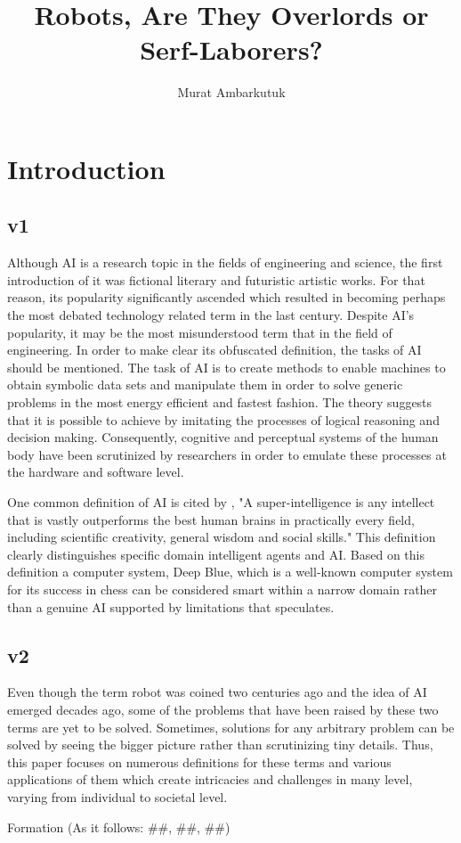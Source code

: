 \documentclass[man]{apa6}
\title{Robots, Are They Overlords or Serf-Laborers?}
\author{Murat Ambarkutuk}
\affiliation{English Language Institute, University of Delaware \\ murata@udel.edu}
\begin{document}
\maketitle
\section{Introduction}
\subsection{v1}
Although AI is a research topic in the fields of engineering and science, the first introduction of it was fictional literary and futuristic artistic works. For that reason, its popularity significantly ascended which resulted in becoming perhaps the most debated technology related term in the last century. Despite AI's popularity, it may be the most misunderstood term that in the field of engineering. In order to make clear its obfuscated definition, the tasks of AI should be mentioned. The task of AI is to create methods to enable machines to obtain symbolic data sets and manipulate them in order to solve generic problems in the most energy efficient and fastest fashion. The theory suggests that it is possible to achieve by imitating the processes of logical reasoning and decision making. Consequently, cognitive and perceptual systems of the human body have been scrutinized by researchers in order to emulate these processes at the hardware and software level.\par
One common definition of AI is cited by , "A super-intelligence is any intellect that is vastly outperforms the best human brains in practically every field, including scientific creativity, general wisdom and social skills." This definition clearly distinguishes specific domain intelligent agents and AI. Based on this definition a computer system, Deep Blue, which is a well-known computer system for its success in chess can be considered smart within a narrow domain rather than a genuine AI supported by limitations that \citeauthor{duff} \citeyear[p.~34]{duff} speculates.
\subsection{v2}
Even though the term robot was coined two centuries ago and the idea of AI emerged decades ago, some of the problems that have been raised by these two terms are yet to be solved. Sometimes, solutions for any arbitrary problem can be solved by seeing the bigger picture rather than scrutinizing tiny details. Thus, this paper focuses on numerous definitions for these terms and various applications of them which create intricacies and challenges in many level, varying from individual to societal level.\par
Formation (As it follows: \#\#, \#\#, \#\#)
\end{document}
